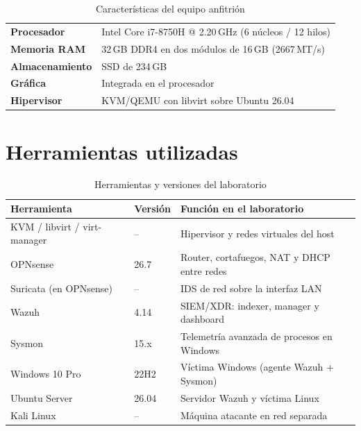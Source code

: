 \begin{nota}
\begin{table}[H]\centering\small
\begin{tabularx}{\linewidth}{>{\bfseries\color{socazul}}l X}
  \toprule
  Procesador     & Intel Core i7-8750H @ 2.20\,GHz (6 núcleos / 12 hilos) \\
  Memoria RAM    & 32\,GB DDR4 en dos módulos de 16\,GB
                   (2667\,MT/s) \\
  Almacenamiento & SSD de 234\,GB \\
  Gráfica        & Integrada en el procesador \\
  Hipervisor     & KVM/QEMU con libvirt sobre Ubuntu 26.04 \\
  \bottomrule
\end{tabularx}
\caption{Características del equipo anfitrión}\label{tab:host}
\end{table}
\end{nota}

\section{Herramientas utilizadas}
\begin{table}[H]\centering\small
\begin{tabularx}{\linewidth}{l l X}
  \toprule
  \textbf{Herramienta} & \textbf{Versión} & \textbf{Función en el laboratorio} \\
  \midrule
  KVM / libvirt / virt-manager & --      & Hipervisor y redes virtuales del host \\
  OPNsense                     & 26.7    & Router, cortafuegos, NAT y DHCP entre redes \\
  Suricata (en OPNsense)       & --      & IDS de red sobre la interfaz LAN \\
  Wazuh                        & 4.14    & SIEM/XDR: indexer, manager y dashboard \\
  Sysmon                       & 15.x    & Telemetría avanzada de procesos en Windows \\
  Windows 10 Pro               & 22H2    & Víctima Windows (agente Wazuh + Sysmon) \\
  Ubuntu Server                & 26.04   & Servidor Wazuh y víctima Linux \\
  Kali Linux                   & --      & Máquina atacante en red separada \\
  \bottomrule
\end{tabularx}
\caption{Herramientas y versiones del laboratorio}\label{tab:herramientas}
\end{table}

